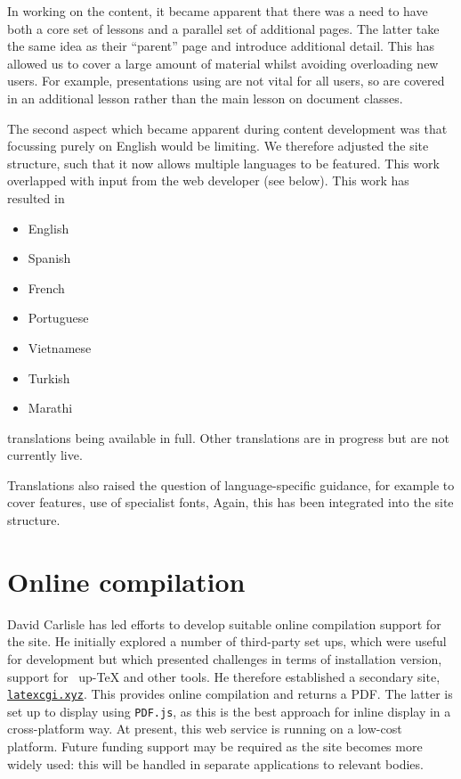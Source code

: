 \documentclass[a4paper]{article}
\begin{document}
In working on the content, it became apparent that there was a need to have
both a core set of lessons and a parallel set of additional pages. The latter
take the same idea as their \enquote{parent} page and introduce additional
detail. This has allowed us to cover a large amount of material whilst avoiding
overloading new users. For example, presentations using  are not
vital for all users, so are covered in an additional lesson rather than
the main lesson on document classes.

The second aspect which became apparent during content development was that
focussing purely on English would be limiting. We therefore adjusted the site
structure, such that it now allows multiple languages to be featured. This work
overlapped with input from the web developer (see below). This work has
resulted in
\begin{itemize}
  \item English
  \item Spanish
  \item French
  \item Portuguese
  \item Vietnamese
  \item Turkish
  \item Marathi
\end{itemize}
translations being available in full. Other translations are in progress but
are not currently live.

Translations also raised the question of language-specific guidance, for
example to cover  features, use of specialist fonts, 
Again, this has been integrated into the site structure.

\section{Online compilation}

David Carlisle has led efforts to develop suitable online compilation support
for the site. He initially explored a number of third-party set ups, which were
useful for development but which presented challenges in terms of installation
version, support for ~up-\TeX{} and other tools. He therefore
established a secondary site, \href{https://latexcgi.xyz}{\nolinkurl{latexcgi.xyz}}. This provides online
compilation and returns a PDF. The latter is set up to display using
\texttt{PDF.js}, as this is the best approach for inline display in a
cross-platform way. At present, this web service is running on a low-cost
platform. Future funding support may be required as the site becomes more
widely used: this will be handled in separate applications to relevant bodies.
\end{document}
